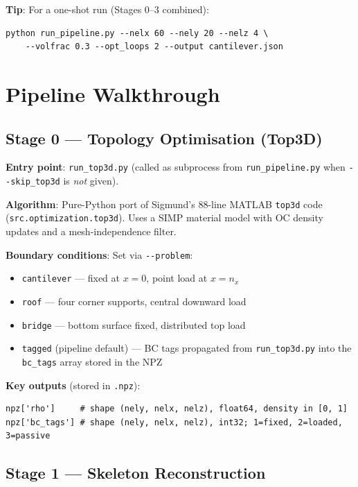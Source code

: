 \documentclass[a4paper, 11pt, openany]{report}
\begin{document}
\textbf{Tip}: For a one-shot run (Stages 0--3 combined):
\begin{lstlisting}[style=bashstyle]
python run_pipeline.py --nelx 60 --nely 20 --nelz 4 \
    --volfrac 0.3 --opt_loops 2 --output cantilever.json
\end{lstlisting}


\section{Pipeline Walkthrough}
\label{sec:pipeline-walkthrough}

\subsection{Stage 0 --- Topology Optimisation (Top3D)}
\label{sec:stage0}

\textbf{Entry point}: \texttt{run\_top3d.py} (called as subprocess from
\texttt{run\_pipeline.py} when \texttt{-{}-skip\_top3d} is \emph{not} given).

\textbf{Algorithm}: Pure-Python port of Sigmund's 88-line MATLAB
\texttt{top3d} code (\texttt{src.optimization.top3d}).  Uses a SIMP material
model with OC density updates and a mesh-independence filter.

\textbf{Boundary conditions}: Set via \texttt{-{}-problem}:
\begin{itemize}[nosep]
    \item \texttt{cantilever} --- fixed at $x = 0$, point load at $x = n_x$
    \item \texttt{roof} --- four corner supports, central downward load
    \item \texttt{bridge} --- bottom surface fixed, distributed top load
    \item \texttt{tagged} (pipeline default) --- BC tags propagated from
          \texttt{run\_top3d.py} into the \texttt{bc\_tags} array stored in the NPZ
\end{itemize}

\textbf{Key outputs} (stored in \texttt{.npz}):

\begin{lstlisting}[style=pythonstyle]
npz['rho']     # shape (nely, nelx, nelz), float64, density in [0, 1]
npz['bc_tags'] # shape (nely, nelx, nelz), int32; 1=fixed, 2=loaded, 3=passive
\end{lstlisting}


\subsection{Stage 1 --- Skeleton Reconstruction}
\label{sec:stage1}
\end{document}
